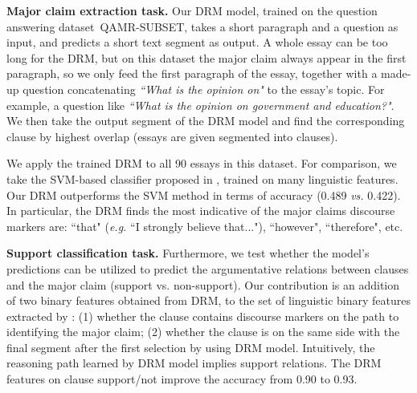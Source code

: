 

\textbf{Major claim extraction task.} Our DRM model, trained on the question answering dataset~\textsc{QAMR-SUBSET},  takes a short paragraph and a question as input, and predicts a short text segment as output. A whole essay can be too long for the DRM, but on this dataset the major claim always appear in the first paragraph, so we only feed the first paragraph of the essay, together with a made-up question concatenating \textit{``What is the opinion on"} to the essay's topic. For example, a question like \textit{``What is the opinion on government and education?"}. We then take the output segment of the DRM model and find the corresponding clause by highest overlap (essays are given segmented into clauses). 

We apply the trained DRM to all 90 essays in this dataset. For comparison, we take the SVM-based classifier proposed in \cite{DBLP:conf/emnlp/StabG14}, trained on many linguistic features. Our DRM outperforms the SVM method in terms of accuracy (0.489 \emph{vs.} 0.422). In particular, the DRM finds the most indicative of the major claims discourse markers  are: ``that" (\emph{e.g.} ``I strongly believe that..."), ``however", ``therefore", etc.




\textbf{Support classification task.}  Furthermore, we test whether the model's predictions can be utilized to predict the argumentative relations between clauses and the major claim (support vs. non-support). Our contribution is an addition of two binary features obtained from DRM, to the set of linguistic binary features extracted by \cite{DBLP:conf/emnlp/StabG14}: (1) whether the clause contains discourse markers on the path to identifying the major claim; (2) whether the clause is on the same side with the final segment after the first selection by using DRM model. Intuitively, the reasoning path learned by DRM model implies support relations. The DRM features on clause support/not improve the accuracy from 0.90 to 0.93.


